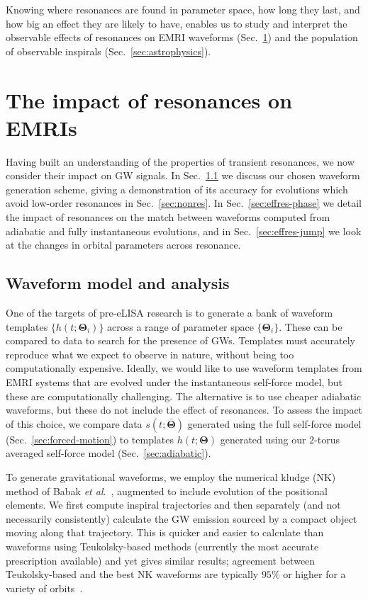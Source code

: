 \documentclass[aps,prd,amsfonts,amssymb,amsmath,nofootinbib,showpacs,superscriptaddress,twocolumn,floatfix]{revtex4-1}
\newcommand{\secref}[1]{Sec.~\ref{sec:#1}}
\begin{document}
Knowing where resonances are found in parameter space, how long they last, and how big an effect they are likely to have, enables us to study and interpret the observable effects of resonances on EMRI waveforms (\secref{waveforms}) and the population of observable inspirals (\secref{astrophysics}).


\section{The impact of resonances on EMRIs}
\label{sec:waveforms}

Having built an understanding of the properties of transient resonances, we now consider their impact on GW signals. In \secref{kludge} we discuss our chosen waveform generation scheme, giving a demonstration of its accuracy for evolutions which avoid low-order resonances in \secref{nonres}. In \secref{effres-phase} we detail the impact of resonances on the match between waveforms computed from adiabatic and fully instantaneous evolutions, and in \secref{effres-jump} we look at the changes in orbital parameters across resonance.

\subsection{Waveform model and analysis}
\label{sec:kludge}

One of the targets of pre-eLISA research is to generate a bank of waveform templates $\{h(t;\boldsymbol{\Theta}_i)\}$ across a range of parameter space $\{\boldsymbol{\Theta}_i\}$. These can be compared to data to search for the presence of GWs. Templates must accurately reproduce what we expect to observe in nature, without being too computationally expensive. Ideally, we would like to use waveform templates from EMRI systems that are evolved under the instantaneous self-force model, but these are computationally challenging. The alternative is to use cheaper adiabatic waveforms, but these do not include the effect of resonances. To assess the impact of this choice, we compare data $s(t;\bar{\boldsymbol{\Theta}})$ generated using the full self-force model (\secref{forced-motion}) to templates $h(t;\boldsymbol{\Theta})$ generated using our $2$-torus averaged self-force model (\secref{adiabatic}).

To generate gravitational waveforms, we employ the numerical kludge (NK) method of Babak {\it{et al}}.~\cite{Babak2007}, augmented to include evolution of the positional elements. We first compute inspiral trajectories and then separately (and not necessarily consistently) calculate the GW emission sourced by a compact object moving along that trajectory. This is quicker and easier to calculate than waveforms using Teukolsky-based methods (currently the most accurate prescription available) and yet gives similar results; agreement between Teukolsky-based and the best NK waveforms are typically $95\%$ or higher for a variety of orbits~\cite{Babak2007, Berry2013}.
\end{document}
